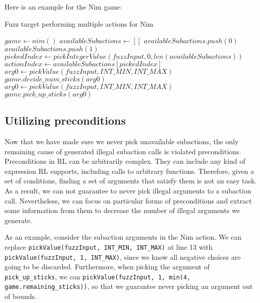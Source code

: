 Here is an example for the Nim game:
\begin{algorithm}[H]
    \caption{Fuzz target performing multiple actions for Nim}
    \begin{algorithmic}[1]
    \STATE $game \gets nim()$
        \STATE $availableSubactions \gets []$
            \STATE $availableSubactions.push(0)$
        \ENDIF
            \STATE $availableSubactions.push(1)$
        \ENDIF
        \STATE $pickedIndex \gets pickIntegerValue(fuzzInput, 0, len(availableSubactions))$
        \STATE $actionIndex \gets availableSubactions[pickedIndex]$
            \STATE $arg0 \gets pickValue(fuzzInput, INT\_MIN, INT\_MAX)$
                \STATE $game.decide\_num\_sticks(arg0)$
            \ENDIF
        \ENDIF
            \STATE $arg0 \gets pickValue(fuzzInput, INT\_MIN, INT\_MAX)$
                \STATE $game.pick\_up\_sticks(arg0)$
            \ENDIF
        \ENDIF
    \ENDWHILE
    \end{algorithmic}
\end{algorithm}

\subsection{Utilizing preconditions}
Now that we have made sure we never pick unavailable subactions, the only remaining cause of generated illegal subaction calls is violated preconditions.
Preconditions in RL can be arbitrarily complex. They can include any kind of expression RL supports, including calls to arbitrary functions.
Therefore, given a set of conditions, finding a set of arguments that satisfy them is not an easy task.
As a result, we can not guarantee to never pick illegal arguments to a subaction call.
Nevertheless, we can focus on particular forms of preconditions and extract some information from them to decrease the number of illegal arguments we generate.

As an example, consider the subaction arguments in the Nim action.
We can replace \texttt{pickValue(fuzzInput, INT\_MIN, INT\_MAX)} at line 13 with \texttt{pickValue(fuzzInput, 1, INT\_MAX)}, since we know all negative choices are going to be discarded.
Furthermore, when picking the argument of \texttt{pick\_up\_sticks}, we can \texttt{pickValue(fuzzInput, 1, min(4, game.remaining\_sticks))}, so that we guarantee never picking an argument out of bounds.

